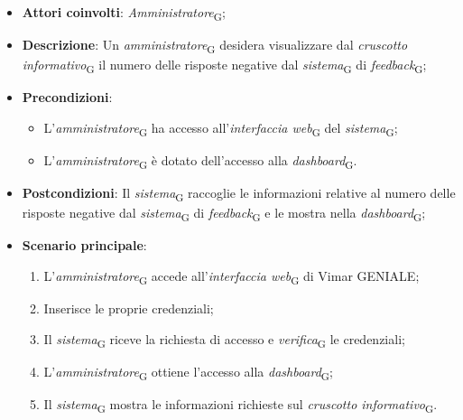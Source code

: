 \begin{itemize}
    \item \textbf{Attori coinvolti}: \textit{Amministratore}\textsubscript{G};
    \item \textbf{Descrizione}: Un \textit{amministratore}\textsubscript{G} desidera visualizzare dal \textit{cruscotto informativo}\textsubscript{G} il numero delle risposte negative dal \textit{sistema}\textsubscript{G} di \textit{feedback}\textsubscript{G};
    \item \textbf{Precondizioni}: 
    \begin{itemize}
        \item L’\textit{amministratore}\textsubscript{G} ha accesso all’\textit{interfaccia web}\textsubscript{G} del \textit{sistema}\textsubscript{G};
        \item L’\textit{amministratore}\textsubscript{G} è dotato dell’accesso alla \textit{dashboard}\textsubscript{G}.
    \end{itemize}
    \item \textbf{Postcondizioni}: Il \textit{sistema}\textsubscript{G} raccoglie le informazioni relative al numero delle risposte negative dal \textit{sistema}\textsubscript{G} di \textit{feedback}\textsubscript{G} e le mostra nella \textit{dashboard}\textsubscript{G};
    \item \textbf{Scenario principale}:
    \begin{enumerate}
        \item L’\textit{amministratore}\textsubscript{G} accede all’\textit{interfaccia web}\textsubscript{G} di Vimar GENIALE;
        \item Inserisce le proprie credenziali;
        \item Il \textit{sistema}\textsubscript{G} riceve la richiesta di accesso e \textit{verifica}\textsubscript{G} le credenziali;
        \item L’\textit{amministratore}\textsubscript{G} ottiene l’accesso alla \textit{dashboard}\textsubscript{G};
        \item Il \textit{sistema}\textsubscript{G} mostra le informazioni richieste sul \textit{cruscotto informativo}\textsubscript{G}.
    \end{enumerate}
\end{itemize}




